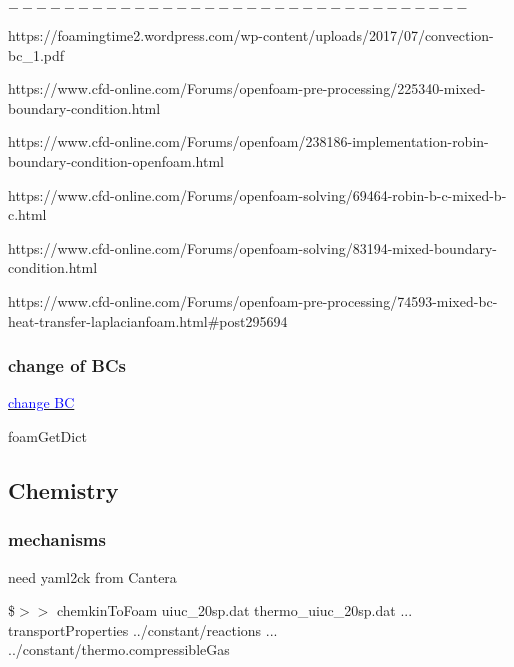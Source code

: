 \documentclass[a4paper, 12pt]{article}
\numberwithin{equation}{section}
\newcommand{\code}{\fontfamily{pcr}\selectfont}
\newcommand{\blue}[1]{\textcolor{blue}{#1}}
\begin{document}
            $---------------------------------$

            https://foamingtime2.wordpress.com/wp-content/uploads/2017/07/convection-bc\_1.pdf

            https://www.cfd-online.com/Forums/openfoam-pre-processing/225340-mixed-boundary-condition.html

            https://www.cfd-online.com/Forums/openfoam/238186-implementation-robin-boundary-condition-openfoam.html

            https://www.cfd-online.com/Forums/openfoam-solving/69464-robin-b-c-mixed-b-c.html

            https://www.cfd-online.com/Forums/openfoam-solving/83194-mixed-boundary-condition.html

            https://www.cfd-online.com/Forums/openfoam-pre-processing/74593-mixed-bc-heat-transfer-laplacianfoam.html\#post295694

        \subsubsection{change of BCs}

            \href{https://www.cfd-online.com/Forums/openfoam-solving/235527-how-change-boundary-condition-after-specific-timein-parallel-solver.html}{\blue{change BC}}

            foamGetDict

    \subsection{Chemistry}

        \subsubsection{mechanisms}

            need {\code yaml2ck} from Cantera

            \$$>>$ {\code chemkinToFoam uiuc\_20sp.dat thermo\_uiuc\_20sp.dat ... \\ transportProperties ../constant/reactions ... \\ ../constant/thermo.compressibleGas}

            \begin{center}
            \end{center}
\end{document}

